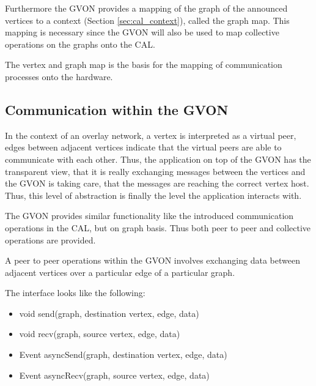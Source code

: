 Furthermore the GVON provides a mapping of the graph of the announced
vertices to a context (Section \ref{sec:cal_context}), called the
graph map. This mapping is necessary since the GVON will also be used
to map collective operations on the graphs onto the CAL.

The vertex and graph map is the basis for the mapping of communication
processes onto the hardware.


\subsection{Communication within the GVON}
In the context of an overlay network, a vertex is interpreted as a
virtual peer, edges between adjacent vertices indicate that the
virtual peers are able to communicate with each other. Thus, the
application on top of the GVON has the transparent view, that it is
really exchanging messages between the vertices and the GVON is taking
care, that the messages are reaching the correct vertex host. Thus, 
this level of abstraction is finally the level the application
interacts with.

The GVON provides similar functionality like the introduced
communication operations in the CAL, but on graph basis. Thus both
peer to peer and collective operations are provided.

A peer to peer operations within the GVON involves exchanging data
between adjacent vertices over a particular edge of a particular graph.


The interface looks like the following:

\begin{itemize}
  \item void send(graph, destination vertex, edge, data)
  \item void recv(graph, source vertex, edge, data)
  \item Event asyncSend(graph, destination vertex, edge, data)
  \item Event asyncRecv(graph, source vertex, edge, data)
\end{itemize}

